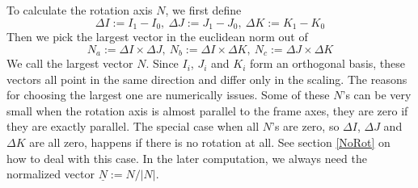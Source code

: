 \documentclass[journal, letterpaper]{IEEEtran}
\begin{document}
To calculate the rotation axis $N$, we first define 
\begin{equation}
\Delta I:= I_1 - I_0, \ \Delta J := J_1 - J_0, \ \Delta K := K_1 - K_0
\end{equation}
Then we pick the largest vector in the euclidean norm out of 
\begin{equation}
N_a := \Delta I \times \Delta J, \ N_b := \Delta I \times \Delta K, \ N_c := \Delta J \times \Delta K
\end{equation}
We call the largest vector $N$. Since $I_i$, $J_i$ and $K_i$ form an orthogonal basis, these vectors all point in the same direction and differ only in the scaling. The reasons for choosing the largest one are numerically issues. Some of these $N$'s can be very small when the rotation axis is almost parallel to the frame axes, they are zero if they are exactly parallel. The special case when all $N$'s are zero, so $\Delta I$, $\Delta J$ and $\Delta K$ are all zero, happens if there is no rotation at all. See section \ref{NoRot} on how to deal with this case. In the later computation, we always need the normalized vector $\underline{N}:=N/|N|$.
  
\end{document}
